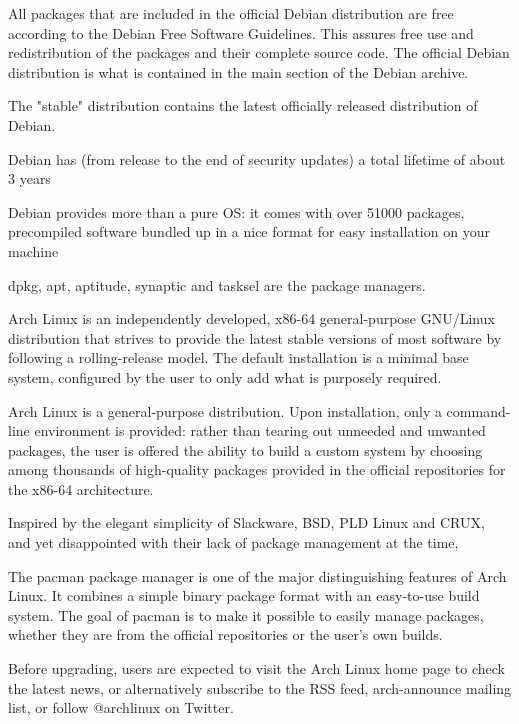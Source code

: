 \documentclass[
	article,			%
	12pt,				%
	openright,			%
	oneside,			%
	a4paper,			%
	chapter=TITLE,		%
	section=TITLE,		%
	subsection=TITLE,	%
	subsubsection=TITLE,%
	subsubsubsection=TITLE, %
	english,			%
	brazil,				%
	]{abntex2}
\begin{document}
All packages that are included in the official Debian distribution are free according to the Debian Free Software Guidelines. This assures free use and redistribution of the packages and their complete source code. The official Debian distribution is what is contained in the main section of the Debian archive.

The "stable" distribution contains the latest officially released distribution of Debian. 

Debian has (from release to the end of security updates) a total lifetime of about 3 years

Debian provides more than a pure OS: it comes with over 51000 packages, precompiled software bundled up in a nice format for easy installation on your machine

\cite{Debian2018}

dpkg, apt, aptitude, synaptic and tasksel are the package managers.

\cite{Debian2016}


Arch Linux is an independently developed, x86-64 general-purpose GNU/Linux distribution that strives to provide the latest stable versions of most software by following a rolling-release model. The default installation is a minimal base system, configured by the user to only add what is purposely required.

Arch Linux is a general-purpose distribution. Upon installation, only a command-line environment is provided: rather than tearing out unneeded and unwanted packages, the user is offered the ability to build a custom system by choosing among thousands of high-quality packages provided in the official repositories for the x86-64 architecture.

Inspired by the elegant simplicity of Slackware, BSD, PLD Linux and CRUX, and yet disappointed with their lack of package management at the time,

\cite{ArchWiki2018a}

The pacman package manager is one of the major distinguishing features of Arch Linux. It combines a simple binary package format with an easy-to-use build system. The goal of pacman is to make it possible to easily manage packages, whether they are from the official repositories or the user's own builds.

\cite{ArchWiki2018b}

Before upgrading, users are expected to visit the Arch Linux home page to check the latest news, or alternatively subscribe to the RSS feed, arch-announce mailing list, or follow @archlinux on Twitter.
\end{document}
